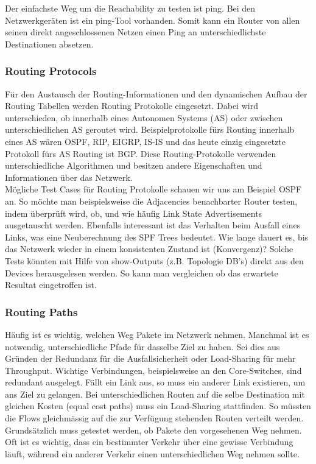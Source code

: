 \documentclass[a4,12pt]{scrartcl}
\begin{document}
\noindent Der einfachste Weg um die Reachability zu testen ist ping. Bei den Netzwerkgeräten ist ein ping-Tool vorhanden. Somit kann ein Router von allen seinen direkt angeschlossenen Netzen einen Ping an unterschiedlichste Destinationen absetzen.
\subsubsection{Routing Protocols}
Für den Austausch der Routing-Informationen und den dynamischen Aufbau der Routing Tabellen werden Routing Protokolle eingesetzt. Dabei wird unterschieden, ob innerhalb eines Autonomen Systems (AS) oder zwischen unterschiedlichen AS geroutet wird. Beispielprotokolle fürs Routing innerhalb eines AS wären OSPF, RIP, EIGRP, IS-IS und das heute einzig eingesetzte Protokoll fürs AS Routing ist BGP. Diese Routing-Protokolle verwenden unterschiedliche Algorithmen und besitzen andere Eigenschaften und Informationen über das Netzwerk.\\

\noindent Mögliche Test Cases für Routing Protokolle schauen wir uns am Beispiel OSPF an. So möchte man beispielsweise die Adjacencies benachbarter Router testen, indem überprüft wird, ob, und wie häufig Link State Advertisements ausgetauscht werden. Ebenfalls interessant ist das Verhalten beim Ausfall eines Links, was eine Neuberechnung des SPF Trees bedeutet. Wie lange dauert es, bis das Netzwerk wieder in einem konsistenten Zustand ist (Konvergenz)? Solche Tests könnten mit Hilfe von show-Outputs (z.B. Topologie DB's) direkt aus den Devices herausgelesen werden. So kann man vergleichen ob das erwartete Resultat eingetroffen ist. 
\subsubsection{Routing Paths}
Häufig ist es wichtig, welchen Weg Pakete im Netzwerk nehmen. Manchmal ist es notwendig, unterschiedliche Pfade für dasselbe Ziel zu haben. Sei dies aus Gründen der Redundanz für die Ausfallsicherheit oder Load-Sharing für mehr Throughput. Wichtige Verbindungen, beispielsweise an den Core-Switches, sind redundant ausgelegt. Fällt ein Link aus, so muss ein anderer Link existieren, um ans Ziel zu gelangen. Bei unterschiedlichen Routen auf die selbe Destination mit gleichen Kosten (equal cost paths) muss ein Load-Sharing stattfinden. So müssten die Flows gleichmässig auf die zur Verfügung stehenden Routen verteilt werden.\\

\noindent Grundsätzlich muss getestet werden, ob Pakete den vorgesehenen Weg nehmen. Oft ist es wichtig, dass ein bestimmter Verkehr über eine gewisse Verbindung läuft, während ein anderer Verkehr einen unterschiedlichen Weg nehmen sollte.\\
\end{document}
